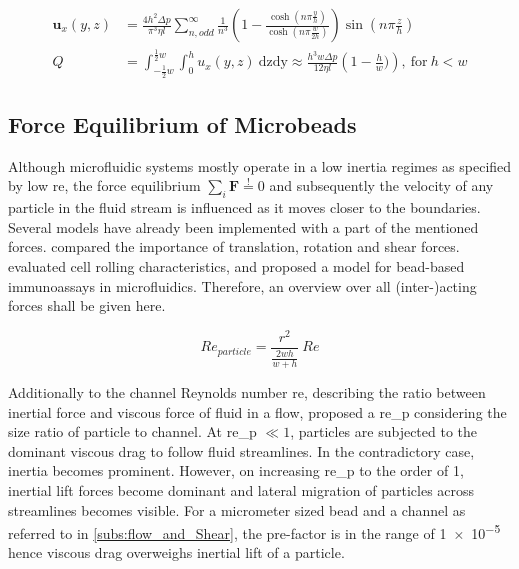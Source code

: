   \begin{align}
\mathbf{u}   _x(y,z) &= \frac{4 h^2 \Delta p}{\pi^3 \eta l} \sum_{n,odd}^{\infty} \frac{1}{n^3} \left( 1- \frac{\cosh (n \pi \frac{y}{h})}{\cosh (n \pi \frac{w}{2h})} \right) \sin (n \pi \frac{z}{h}) \label{eq:flowVelocityRect} \\
  Q    &= \int_{-\frac{1}{2}w}^{\frac{1}{2}w} \int_{0}^{h} u   _x(y,z) \ \mathrm{dzdy} \approx \frac{h^3 w \Delta p}{12 \eta l} \left( 1 - \frac{h}{w}) \right) \label{eq:flowRateRect} \mathrm{, \ for \ } h < w
\end{align}


\subsection{Force Equilibrium of Microbeads}
Although microfluidic systems mostly operate in a low inertia regimes as specified by low \gls{re}, the force equilibrium $\sum_{i} \mathbf{F} \overset{!}{=} 0$ and subsequently the velocity of any particle in the fluid stream is influenced as it moves closer to the boundaries. Several models have already been implemented with a part of the mentioned forces. \citet{lit:fluid:comparison} compared the importance of translation, rotation and shear forces. \citet{lit:fluidics:RollingCharacteristics} evaluated cell rolling characteristics, and \citet{lit:fluidic:ModelMIT} proposed a model for bead-based immunoassays in microfluidics. Therefore, an overview over all (inter-)acting forces shall be given here.

\begin{equation}
	\mathit{Re}_{particle} = \frac{r^2}{\frac{2wh}{w+h}} \ \mathit{Re} 
\end{equation}

Additionally to the channel Reynolds number \gls{re}, describing the ratio between inertial force and viscous force of fluid in a flow, \citet{lit:fluidic:f_wall} proposed a \gls{re_p} considering the size ratio of particle to channel. At \gls{re_p} $\ll 1$, particles are subjected to the dominant viscous drag to follow fluid streamlines. In the contradictory case, inertia becomes prominent. However, on increasing \gls{re_p} to the order of 1, inertial lift forces become dominant and lateral migration of particles across streamlines becomes visible.  For a micrometer sized bead and a channel as referred to in \cref{subs:flow_and_Shear}, the pre-factor is in the range of \num{1e-5} hence viscous drag overweighs inertial lift of a particle.

